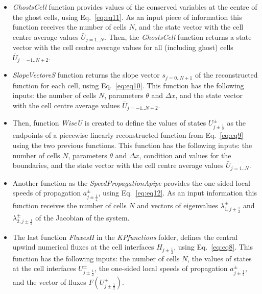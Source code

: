 \documentclass[%
]{USN-PhD}
\begin{document}
\begin{itemize}
\item \emph{GhostsCell} function provides values of the conserved variables at the centre of the ghost cells, using Eq.~\ref{eq:eq11}. As an input piece of information this function receives the number of cells $N$, and the state vector with the cell centre average values $\bar{U}_{j=1..N}$. Then, the \emph{GhostsCell} function returns a state vector with the cell centre average values for all (including ghost) cells $\bar{U}_{j=-1..N+2}$.
\item \emph{SlopeVectoreS} function returns the slope vector $s_{j=0..N+1}$ of the reconstructed function for each cell, using Eq.~\ref{eq:eq10}. This function has the following inputs: the number of cells $N$, parameters $\theta$ and $\Delta x$, and the state vector with the cell centre average values $\bar{U}_{j=-1..N+2}$.
\item Then, function \emph{WiseU} is created to define the values of states $U^\pm_{j\pm\frac{1}{2}}$ as the endpoints of a piecewise linearly reconstructed function from Eq.~\ref{eq:eq9} using the two previous functions. This function has the following inputs: the number of cells $N$, parameters $\theta$ and $\Delta x$, condition and values for the boundaries, and the state vector with the cell centre average values $\bar{U}_{j=1..N}$.
\item Another function as the \emph{SpeedPropagationApipe} provides the one-sided local speeds of propagation $a^\pm_{j\pm\frac{1}{2}}$, using Eq.~\ref{eq:eq12}. As an input information this function receives the number of cells $N$ and vectors of eigenvalues $\lambda^\pm_{1,j\pm\frac{1}{2}}$ and $\lambda^\pm_{2,j\pm\frac{1}{2}}$ of the Jacobian of the system.
\item The last function \emph{FluxesH} in the \emph{KPfunctions} folder, defines the central upwind numerical fluxes at the cell interfaces  $H_{j\pm\frac{1}{2}}$, using Eq.~\ref{eq:eq8}. This function has the following inputs: the number of cells $N$, the values of states at the cell interfaces $U^\pm_{j\pm\frac{1}{2}}$, the one-sided local speeds of propagation $a^\pm_{j\pm\frac{1}{2}}$, and the vector of fluxes $F\left(U^\pm_{j\pm\frac{1}{2}}\right)$.
\end{itemize}
\end{document}
